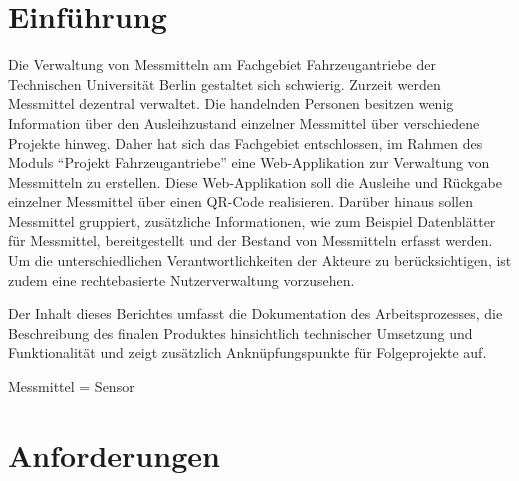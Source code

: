 \documentclass[
]{article}
\author{}
\date{\vspace{-2.5em}}
\begin{document}
\renewcommand*\contentsname{Inhaltsverzeichnis}
{
\setcounter{tocdepth}{2}
\tableofcontents
}
\renewcommand{\figurename}{Abbildung}
\renewcommand{\tablename}{Tabelle}
\renewcommand{\listfigurename}{Abbildungsverzeichnis}
\renewcommand{\listtablename}{Tabellenverzeichnis}
\renewcommand{\refname}{Literaturverzeichnis}


\newpage{}

\listoffigures
{}

\newpage{}

\listoftables
{}

\newpage{}


\hypertarget{introduction}{%
\section{Einführung}\label{introduction}}

Die Verwaltung von Messmitteln am Fachgebiet Fahrzeugantriebe der Technischen Universität Berlin gestaltet sich schwierig. Zurzeit werden Messmittel dezentral verwaltet. Die handelnden Personen besitzen wenig Information über den Ausleihzustand einzelner Messmittel über verschiedene Projekte hinweg. Daher hat sich das Fachgebiet entschlossen, im Rahmen des Moduls ``Projekt Fahrzeugantriebe'' eine Web-Applikation zur Verwaltung von Messmitteln zu erstellen. Diese Web-Applikation soll die Ausleihe und Rückgabe einzelner Messmittel über einen QR-Code realisieren. Darüber hinaus sollen Messmittel gruppiert, zusätzliche Informationen, wie zum Beispiel Datenblätter für Messmittel, bereitgestellt und der Bestand von Messmitteln erfasst werden. Um die unterschiedlichen Verantwortlichkeiten der Akteure zu berücksichtigen, ist zudem eine rechtebasierte Nutzerverwaltung vorzusehen.

Der Inhalt dieses Berichtes umfasst die Dokumentation des Arbeitsprozesses, die Beschreibung des finalen Produktes hinsichtlich technischer Umsetzung und Funktionalität und zeigt zusätzlich Anknüpfungspunkte für Folgeprojekte auf.

Messmittel = Sensor

\hypertarget{requirements}{%
\section{Anforderungen}\label{requirements}}
\end{document}

